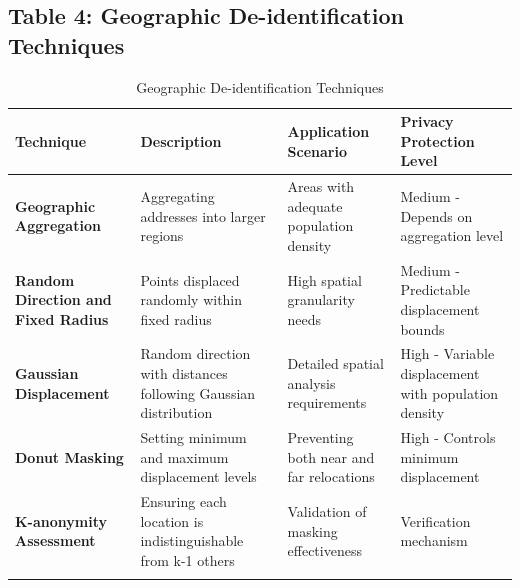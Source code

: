 \graphicspath{{./}{./sections/images/}{./images/}}\documentclass[12pt,a4paper,landscape]{article}
\begin{document}
\subsection*{Table 4: Geographic De-identification Techniques}
\begin{longtable}{L{4cm}L{6cm}L{6cm}L{4cm}}
\toprule
\textbf{Technique} & \textbf{Description} & \textbf{Application Scenario} & \textbf{Privacy Protection Level} \\
\midrule
\endhead

\textbf{Geographic Aggregation} 
& Aggregating addresses into larger regions 
& Areas with adequate population density 
& Medium - Depends on aggregation level \\
\midrule

\textbf{Random Direction and Fixed Radius} 
& Points displaced randomly within fixed radius 
& High spatial granularity needs 
& Medium - Predictable displacement bounds \\
\midrule

\textbf{Gaussian Displacement} 
& Random direction with distances following Gaussian distribution 
& Detailed spatial analysis requirements 
& High - Variable displacement with population density \\
\midrule

\textbf{Donut Masking} 
& Setting minimum and maximum displacement levels 
& Preventing both near and far relocations 
& High - Controls minimum displacement \\
\midrule

\textbf{K-anonymity Assessment} 
& Ensuring each location is indistinguishable from k-1 others 
& Validation of masking effectiveness 
& Verification mechanism \\
\bottomrule
\caption{Geographic De-identification Techniques}
\end{longtable}
\clearpage

\end{document}
